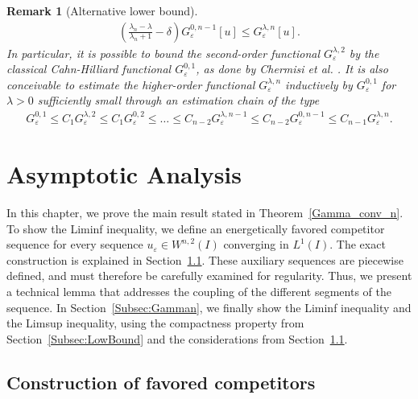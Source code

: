 \documentclass{article}
\newcommand{\lam}{\lambda}
\newcommand{\eps}{\varepsilon}
\numberwithin{figure}{section}
\newtheorem{rem}[theorem]{Remark}
\numberwithin{equation}{section}
\begin{document}
\begin{rem}[Alternative lower bound]
\begin{align}
        \left(\frac{\lam_n - \lam}{\lam_n + 1} - \delta\right) G_\eps^{0,n-1}[u] \leq G_\eps^{\lam,n}[u].
    \end{align}
In particular, it is possible to bound the second-order functional $G^{\lam,2}_\eps$ by the classical Cahn-Hilliard functional $G_\eps^{0,1}$, as done by Chermisi et al. \cite[Section~4]{CheDalFonLeo}. It is also conceivable to estimate the higher-order functional $G^{\lam,n}_\eps$ inductively by $G_\eps^{0,1}$ for $\lam > 0$ sufficiently small through an estimation chain of the type
 \begin{align}
     G_\eps^{0,1} \leq C_1 G_\eps^{\lam,2} \leq C_1 G_\eps^{0,2} \leq \ldots \leq C_{n-2} G_\eps^{\lam,n-1} \leq C_{n-2} G_\eps^{0,n-1} \leq C_{n-1} G_\eps^{\lam,n}.
\end{align}

\end{rem}



\section{Asymptotic Analysis} \label{Sec:Gamma}

In this chapter, we prove the main result stated in Theorem~\ref{Gamma_conv_n}. To show the Liminf inequality, we define an energetically favored competitor sequence for every sequence $u_\eps \in W^{n,2}(I)$ converging in $L^1(I)$. The exact construction is explained in Section~\ref{Subsec:FavComp}. These auxiliary sequences are piecewise defined, and must therefore be carefully examined for regularity. Thus, we present a technical lemma that addresses the coupling of the different segments of the sequence. In Section~\ref{Subsec:Gamman}, we finally show the Liminf inequality and the Limsup inequality, using the compactness property from Section~\ref{Subsec:LowBound} and the considerations from Section~\ref{Subsec:FavComp}.



\subsection{Construction of favored competitors} \label{Subsec:FavComp}
\end{document}
